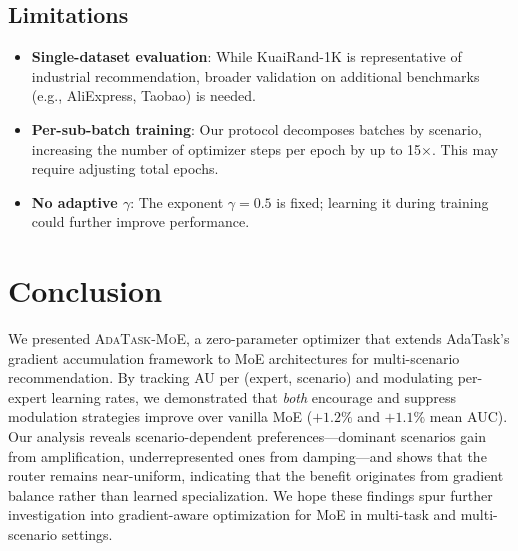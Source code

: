 \documentclass{article}
\begin{document}
\subsection{Limitations}
\begin{itemize}
    \item \textbf{Single-dataset evaluation}: While KuaiRand-1K is representative of industrial recommendation, broader validation on additional benchmarks (e.g., AliExpress, Taobao) is needed.
    \item \textbf{Per-sub-batch training}: Our protocol decomposes batches by scenario, increasing the number of optimizer steps per epoch by up to 15$\times$. This may require adjusting total epochs.
    \item \textbf{No adaptive $\gamma$}: The exponent $\gamma=0.5$ is fixed; learning it during training could further improve performance.
\end{itemize}

\section{Conclusion}
\label{sec:conclusion}

We presented \textsc{AdaTask-MoE}, a zero-parameter optimizer that extends AdaTask's gradient accumulation framework to MoE architectures for multi-scenario recommendation.
By tracking AU per (expert, scenario) and modulating per-expert learning rates, we demonstrated that \emph{both} encourage and suppress modulation strategies improve over vanilla MoE ($+1.2\%$ and $+1.1\%$ mean AUC).
Our analysis reveals scenario-dependent preferences---dominant scenarios gain from amplification, underrepresented ones from damping---and shows that the router remains near-uniform, indicating that the benefit originates from gradient balance rather than learned specialization.
We hope these findings spur further investigation into gradient-aware optimization for MoE in multi-task and multi-scenario settings.
\end{document}

